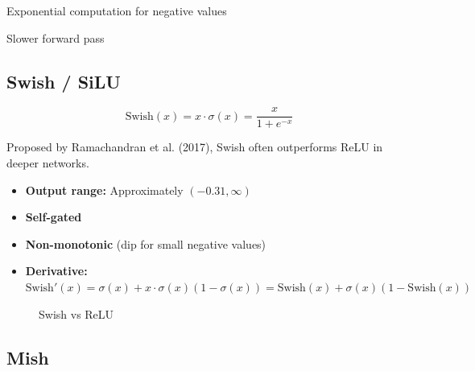\begin{disadvantages}
    \item Exponential computation for negative values
    \item Slower forward pass
\end{disadvantages}

\subsection{Swish / SiLU}

\begin{equation}
\text{Swish}(x) = x \cdot \sigma(x) = \frac{x}{1 + e^{-x}}
\end{equation}

Proposed by Ramachandran et al. (2017), Swish often outperforms ReLU in deeper networks.

\begin{properties}
\begin{itemize}
    \item \textbf{Output range:} Approximately $(-0.31, \infty)$
    \item \textbf{Self-gated}
    \item \textbf{Non-monotonic} (dip for small negative values)
    \item \textbf{Derivative:} $\text{Swish}'(x) = \sigma(x) + x \cdot \sigma(x)(1 - \sigma(x)) = \text{Swish}(x) + \sigma(x)(1 - \text{Swish}(x))$
\end{itemize}
\end{properties}

\begin{figure}[htbp]
    \centering
    \caption[Swish activation function]{Swish vs ReLU}
    \label{fig:swish}
\end{figure}

\subsection{Mish}

